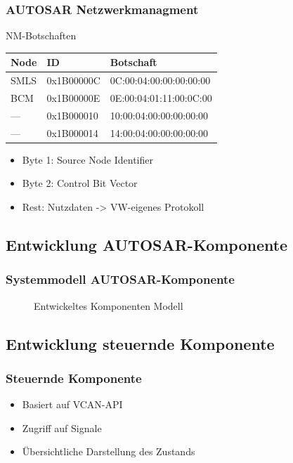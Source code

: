 \documentclass[]{beamer}
\newcommand{\inputImage}[1]{}
\begin{document}
\begin{frame}
\frametitle{AUTOSAR Netzwerkmanagment}
    \begin{exampleblock}{NM-Botschaften}
        \begin{table}
        \centering
            \begin{tabular}[h]{l l l}
                Node & ID & Botschaft\\
                \toprule
                SMLS        & 0x1B00000C & 0C:00:04:00:00:00:00:00\\
                BCM         & 0x1B00000E & 0E:00:04:01:11:00:0C:00\\
                ---         & 0x1B000010 & 10:00:04:00:00:00:00:00\\
                ---         & 0x1B000014 & 14:00:04:00:00:00:00:00\\
            \end{tabular}
        \label{tab:jitter_statistik}
        \end{table}
    \end{exampleblock}
    \begin{itemize}
        \item Byte 1: Source Node Identifier
        \item Byte 2: Control Bit Vector
        \item Rest: Nutzdaten -> VW-eigenes Protokoll
    \end{itemize}
\end{frame}




\subsection{Entwicklung AUTOSAR-Komponente}
\begin{frame}
\frametitle{Systemmodell AUTOSAR-Komponente}
    \begin{figure}[ht]
        \centering
        \resizebox{\linewidth}{!}{\inputImage{SMLS_Modell.dia}}
        \caption{Entwickeltes Komponenten Modell}
        \label{fig:smls_modell}
    \end{figure}
\end{frame}




\subsection{Entwicklung steuernde Komponente}
\begin{frame}
\frametitle{Steuernde Komponente}
    \begin{itemize}
        \item Basiert auf VCAN-API
        \item Zugriff auf Signale
        \item Übersichtliche Darstellung des Zustands
    \end{itemize}
\end{frame}
\end{document}

